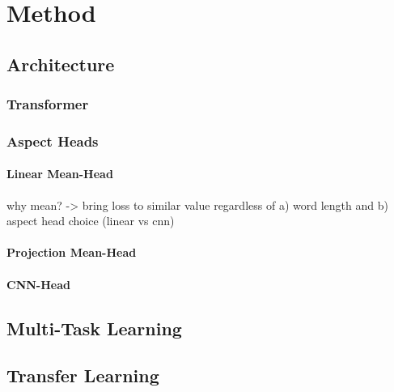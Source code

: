 \chapter{Method}
\label{ch:method}

\section{Architecture}

\subsection{Transformer}

\subsection{Aspect Heads}

\subsubsection{Linear Mean-Head}

why mean? -> bring loss to similar value regardless of a) word length and b) aspect head choice (linear vs cnn)

\subsubsection{Projection Mean-Head}

\subsubsection{CNN-Head}

\section{Multi-Task Learning}

\section{Transfer Learning}

